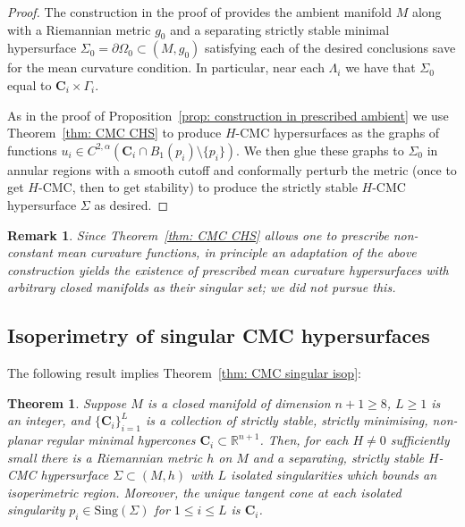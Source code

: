 \documentclass[12pt]{article}
\newtheorem{theorem}{Theorem}
\newtheorem{remark}{Remark}
\begin{document}
\begin{proof}
    The construction in the proof of \cite[Theorem 2]{S00} provides the ambient manifold $M$ along with a Riemannian metric $g_0$ and a separating strictly stable minimal hypersurface $\Sigma_0 = \partial \Omega_0 \subset (M,g_0)$ satisfying each of the desired conclusions save for the mean curvature condition. In particular, near each $\Lambda_i$ we have that $\Sigma_0$ equal to $\mathbf{C}_i \times \Gamma_i$.

    \bigskip
    
    As in the proof of Proposition~\ref{prop: construction in prescribed ambient} we use Theorem~\ref{thm: CMC CHS} to produce $H$-CMC hypersurfaces as the graphs of functions $u_i \in C^{2,\alpha}(\mathbf{C}_i \cap B_1(p_i) \setminus \{p_i\})$. We then glue these graphs to $\Sigma_0$ in annular regions with a smooth cutoff and conformally perturb the metric (once to get $H$-CMC, then to get stability) to produce the strictly stable $H$-CMC hypersurface $\Sigma$ as desired.
\end{proof}

\begin{remark}
    Since Theorem~\ref{thm: CMC CHS} allows one to prescribe non-constant mean curvature functions, in principle an adaptation of the above construction yields the existence of prescribed mean curvature hypersurfaces with arbitrary closed manifolds as their singular set; we did not pursue this.
\end{remark}


\subsection{Isoperimetry of singular CMC hypersurfaces}

The following result implies Theorem~\ref{thm: CMC singular isop}: 

\begin{theorem} Suppose $M$ is a closed manifold of dimension $n + 1 \geq 8$, $L \geq 1$ is an integer, and $\{\mathbf{C}_i\}_{i = 1}^L$ is a collection of strictly stable, strictly minimising, non-planar regular minimal hypercones $\mathbf{C}_i \subset \mathbb{R}^{n + 1}$. Then, for each $H \neq 0$ sufficiently small there is a Riemannian metric $h$ on $M$ and a separating, strictly stable $H$-CMC hypersurface $\Sigma \subset (M,h)$ with $L$ isolated singularities which bounds an isoperimetric region. Moreover, the unique tangent cone at each isolated singularity $p_i \in \mathrm{Sing}(\Sigma)$ for $1 \leq i \leq L$ is $\mathbf{C}_i$.
\end{theorem}
\end{document}
